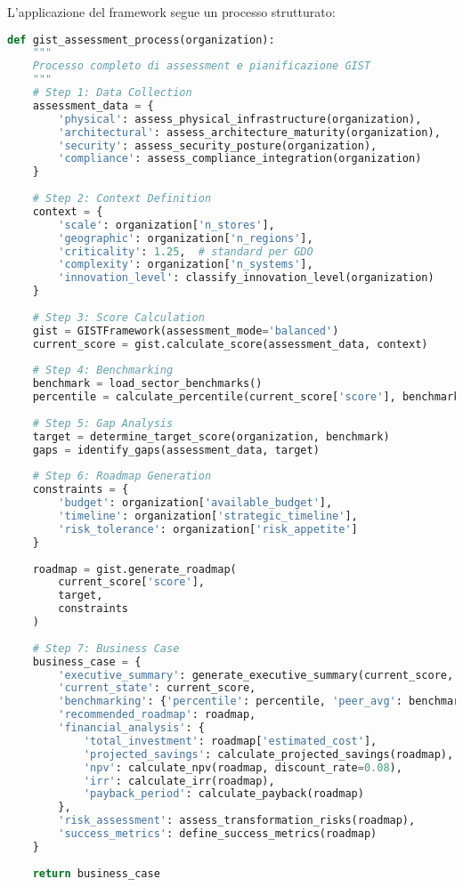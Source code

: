 L'applicazione del framework segue un processo strutturato:

\begin{lstlisting}[language=Python, caption=Processo assessment GIST]
def gist_assessment_process(organization):
    """
    Processo completo di assessment e pianificazione GIST
    """
    # Step 1: Data Collection
    assessment_data = {
        'physical': assess_physical_infrastructure(organization),
        'architectural': assess_architecture_maturity(organization),
        'security': assess_security_posture(organization),
        'compliance': assess_compliance_integration(organization)
    }
    
    # Step 2: Context Definition
    context = {
        'scale': organization['n_stores'],
        'geographic': organization['n_regions'],
        'criticality': 1.25,  # standard per GDO
        'complexity': organization['n_systems'],
        'innovation_level': classify_innovation_level(organization)
    }
    
    # Step 3: Score Calculation
    gist = GISTFramework(assessment_mode='balanced')
    current_score = gist.calculate_score(assessment_data, context)
    
    # Step 4: Benchmarking
    benchmark = load_sector_benchmarks()
    percentile = calculate_percentile(current_score['score'], benchmark)
    
    # Step 5: Gap Analysis
    target = determine_target_score(organization, benchmark)
    gaps = identify_gaps(assessment_data, target)
    
    # Step 6: Roadmap Generation
    constraints = {
        'budget': organization['available_budget'],
        'timeline': organization['strategic_timeline'],
        'risk_tolerance': organization['risk_appetite']
    }
    
    roadmap = gist.generate_roadmap(
        current_score['score'],
        target,
        constraints
    )
    
    # Step 7: Business Case
    business_case = {
        'executive_summary': generate_executive_summary(current_score, roadmap),
        'current_state': current_score,
        'benchmarking': {'percentile': percentile, 'peer_avg': benchmark['mean']},
        'recommended_roadmap': roadmap,
        'financial_analysis': {
            'total_investment': roadmap['estimated_cost'],
            'projected_savings': calculate_projected_savings(roadmap),
            'npv': calculate_npv(roadmap, discount_rate=0.08),
            'irr': calculate_irr(roadmap),
            'payback_period': calculate_payback(roadmap)
        },
        'risk_assessment': assess_transformation_risks(roadmap),
        'success_metrics': define_success_metrics(roadmap)
    }
    
    return business_case
\end{lstlisting}

